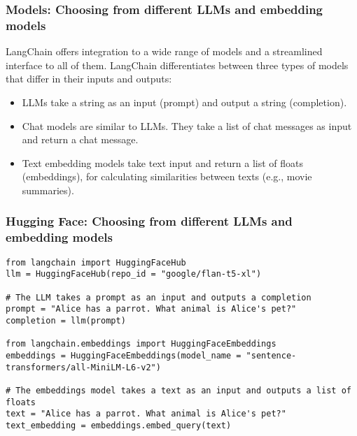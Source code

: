 \begin{frame}[fragile]\frametitle{Models: Choosing from different LLMs and embedding models}

LangChain offers integration to a wide range of models and a streamlined interface to all of them. LangChain differentiates between three types of models that differ in their inputs and outputs:

\begin{itemize}
\item LLMs take a string as an input (prompt) and output a string (completion).
\item Chat models are similar to LLMs. They take a list of chat messages as input and return a chat message.
\item Text embedding models take text input and return a list of floats (embeddings), for calculating similarities between texts (e.g., movie summaries).
\end{itemize}

\end{frame}

\begin{frame}[fragile]\frametitle{Hugging Face: Choosing from different LLMs and embedding models}

\begin{lstlisting}
from langchain import HuggingFaceHub
llm = HuggingFaceHub(repo_id = "google/flan-t5-xl")

# The LLM takes a prompt as an input and outputs a completion
prompt = "Alice has a parrot. What animal is Alice's pet?"
completion = llm(prompt)

from langchain.embeddings import HuggingFaceEmbeddings
embeddings = HuggingFaceEmbeddings(model_name = "sentence-transformers/all-MiniLM-L6-v2")

# The embeddings model takes a text as an input and outputs a list of floats
text = "Alice has a parrot. What animal is Alice's pet?"
text_embedding = embeddings.embed_query(text)


\end{lstlisting}


\end{frame}

